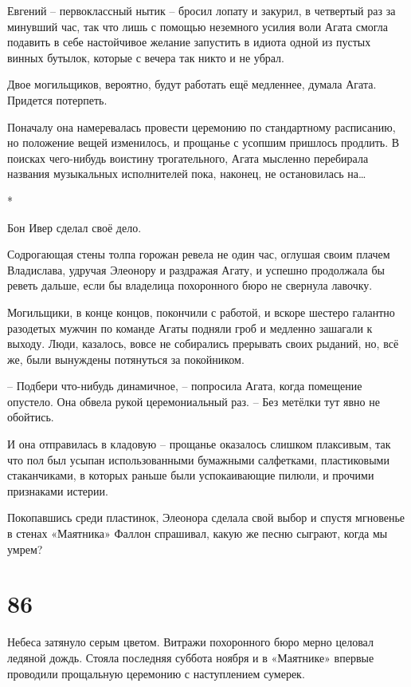 \documentclass[
  a5paperpaper,
  DIV=11,
  numbers=noendperiod]{scrreprt}
\begin{document}
Евгений -- первоклассный нытик -- бросил лопату и закурил, в четвертый
раз за минувший час, так что лишь с помощью неземного усилия воли Агата
смогла подавить в себе настойчивое желание запустить в идиота одной из
пустых винных бутылок, которые с вечера так никто и не убрал.

Двое могильщиков, вероятно, будут работать ещё медленнее, думала Агата.
Придется потерпеть.

Поначалу она намеревалась провести церемонию по стандартному расписанию,
но положение вещей изменилось, и прощанье с усопшим пришлось продлить. В
поисках чего-нибудь воистину трогательного, Агата мысленно перебирала
названия музыкальных исполнителей пока, наконец, не остановилась
на\ldots{}

*

Бон Ивер сделал своё дело.

Содрогающая стены толпа горожан ревела не один час, оглушая своим плачем
Владислава, удручая Элеонору и раздражая Агату, и успешно продолжала бы
реветь дальше, если бы владелица похоронного бюро не свернула лавочку.

Могильщики, в конце концов, покончили с работой, и вскоре шестеро
галантно разодетых мужчин по команде Агаты подняли гроб и медленно
зашагали к выходу. Люди, казалось, вовсе не собирались прерывать своих
рыданий, но, всё же, были вынуждены потянуться за покойником.

-- Подбери что-нибудь динамичное, -- попросила Агата, когда помещение
опустело. Она обвела рукой церемониальный раз. -- Без метёлки тут явно
не обойтись.

И она отправилась в кладовую -- прощанье оказалось слишком плаксивым,
так что пол был усыпан использованными бумажными салфетками,
пластиковыми стаканчиками, в которых раньше были успокаивающие пилюли, и
прочими признаками истерии.

Покопавшись среди пластинок, Элеонора сделала свой выбор и спустя
мгновенье в стенах «Маятника» Фаллон спрашивал, какую же песню сыграют,
когда мы умрем?

\section*{86}\label{86}


Небеса затянуло серым цветом. Витражи похоронного бюро мерно целовал
ледяной дождь. Стояла последняя суббота ноября и в «Маятнике» впервые
проводили прощальную церемонию с наступлением сумерек.
\end{document}
